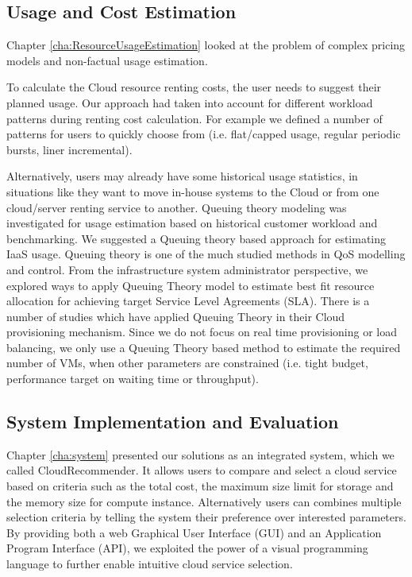 \subsection{Usage and Cost Estimation}
Chapter \ref{cha:ResourceUsageEstimation} looked at the problem of complex pricing models and non-factual usage estimation.

To calculate the Cloud resource renting costs, the user needs to suggest their planned usage. Our approach had taken into account for
different workload patterns during renting cost calculation. For example we defined a number of patterns for users to quickly choose from (i.e. flat/capped usage, regular periodic bursts, liner incremental). 

Alternatively, users may already have some historical
usage statistics, in situations like they want to move in-house systems to the Cloud or from one cloud/server renting service to another. 
Queuing theory modeling was investigated for usage estimation based on historical customer workload and benchmarking.
We suggested a Queuing theory based approach for estimating IaaS usage.
Queuing theory is one of the much studied methods in QoS modelling and control.
From the infrastructure system administrator perspective, we explored ways to apply Queuing Theory model to estimate best fit resource allocation for achieving target Service Level Agreements (SLA). 
There is a number of studies which have applied Queuing Theory in their Cloud provisioning mechanism. Since we do not focus on real time provisioning or load balancing, we only use a Queuing Theory based method to estimate the required number of VMs, when other parameters are constrained (i.e. tight budget, performance target on waiting time or throughput).

\subsection{System Implementation and Evaluation}
Chapter \ref{cha:system} presented our solutions as an integrated system, which we called CloudRecommender.
It allows users to compare and select a cloud service based on criteria such as the total cost, the maximum size limit for storage and the memory size for compute instance. 
Alternatively users can combines multiple selection criteria by telling the system their preference over interested parameters.
By providing both a web Graphical User Interface (GUI) and an Application Program Interface (API), we exploited the power of a visual programming
language to further enable intuitive cloud service selection.

